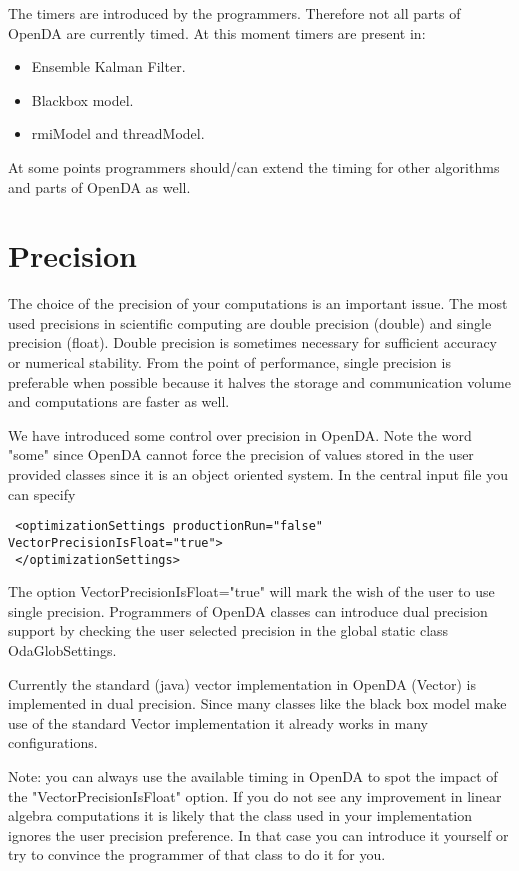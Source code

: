 \documentclass[12pt]{article}
\begin{document}
The timers are introduced by the programmers. Therefore not all parts of OpenDA are currently timed. At this moment timers are present in:
\begin{itemize}
\item Ensemble Kalman Filter.
\item Blackbox model.
\item rmiModel and threadModel.
\end{itemize}

At some points programmers should/can extend the timing for other algorithms and parts of OpenDA as well.

\section{Precision}
The choice of the precision of your computations is an important issue. The most used precisions in scientific computing are double precision (double) and single precision (float). Double precision is sometimes necessary for sufficient accuracy or numerical stability. From the point of performance, single precision is preferable when possible because it halves the storage and communication volume and computations are faster as well.

We have introduced some control over precision in OpenDA. Note the word "some" since OpenDA cannot force the precision of values stored in the user provided classes since it is an object oriented system. In the central input file you can specify
{\footnotesize
\begin{verbatim}
 <optimizationSettings productionRun="false" VectorPrecisionIsFloat="true">
 </optimizationSettings>
\end{verbatim}}  
The option VectorPrecisionIsFloat="true" will mark the wish of the user to use single precision. Programmers of OpenDA classes can introduce dual precision support by checking the user selected precision in the global static class OdaGlobSettings.

Currently the standard (java) vector implementation in OpenDA (Vector) is implemented in dual precision. Since many classes like the black box model make use of the standard Vector implementation it already works in many configurations. 

Note: you can always use the available timing in OpenDA to spot the impact of the "VectorPrecisionIsFloat" option. If you do not see any improvement in linear algebra computations it is likely that the class used in your implementation ignores the user precision preference. In that case you can introduce it yourself or try to convince the programmer of that class to do it for you.
\end{document}
